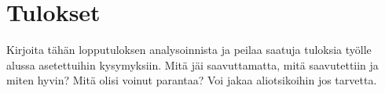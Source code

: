 \chapter{Tulokset}
\label{ch:tulokset}
\begin{it}
	Kirjoita tähän lopputuloksen analysoinnista ja peilaa saatuja tuloksia työlle alussa asetettuihin kysymyksiin. Mitä jäi saavuttamatta, mitä saavutettiin ja miten hyvin? Mitä olisi voinut parantaa? Voi jakaa aliotsikoihin jos tarvetta.
\end{it}